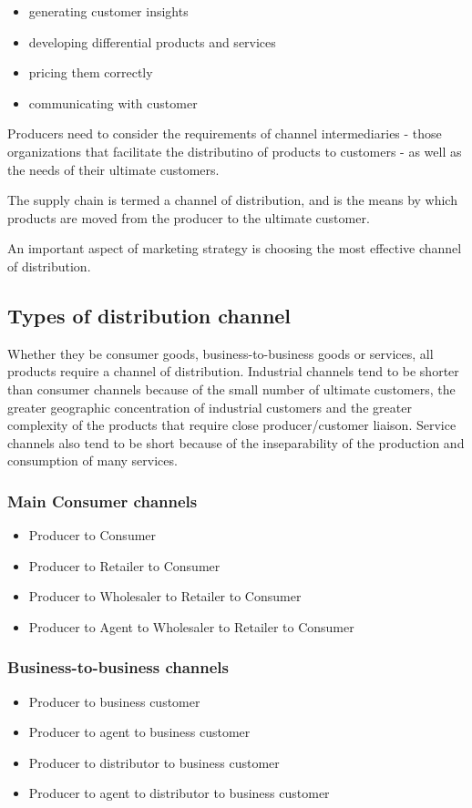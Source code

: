 \documentclass{article}
\begin{document}
\begin{itemize}
    \item generating customer insights
    \item developing differential products and services
    \item pricing them correctly
    \item communicating with customer
\end{itemize}

Producers need to consider the requirements of channel intermediaries - those organizations that facilitate the distributino of products to customers - as well as the needs of their ultimate customers.

The supply chain is termed a channel of distribution, and is the means by which products are moved from the producer to the ultimate customer. 

An important aspect of marketing strategy is choosing the most effective channel of distribution.

\subsection{Types of distribution channel}
Whether they be consumer goods, business-to-business goods or services, all products require a channel of distribution. Industrial channels tend to be shorter than consumer channels because of the small number of ultimate customers, the greater geographic concentration of industrial customers and the greater complexity of the products that require close producer/customer liaison. Service channels also tend to be short because of the inseparability of the production and consumption of many services.

\subsubsection*{Main Consumer channels}
\begin{itemize}
    \item Producer to Consumer
    \item Producer to Retailer to Consumer
    \item Producer to Wholesaler to Retailer to Consumer
    \item Producer to Agent to Wholesaler to Retailer to Consumer
\end{itemize}

\subsubsection*{Business-to-business channels}
\begin{itemize}
    \item Producer to business customer
    \item Producer to agent to business customer
    \item Producer to distributor to business customer
    \item Producer to agent to distributor to business customer
\end{itemize}
\end{document}

